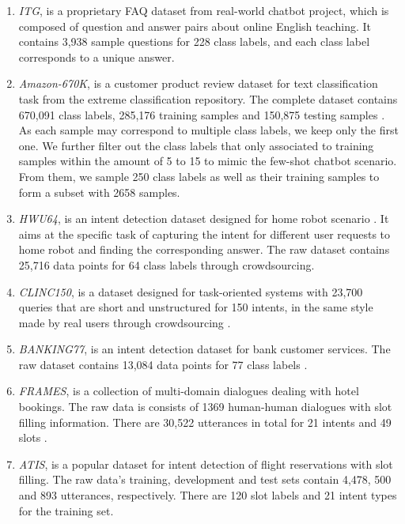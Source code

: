\begin{enumerate}
  \item \emph{ITG},  is  a proprietary FAQ dataset from real-world
  chatbot  project,  which is composed of question and answer pairs about online
  English teaching. It contains 3,938 sample questions for 228 class labels, and
  each class label corresponds to a unique answer.

  \item \emph{Amazon-670K}, is a customer product review dataset for
  text  classification  task  from  the  extreme  classification repository. The
  complete  dataset  contains 670,091 class labels, 285,176 training samples and
  150,875   testing   samples   \cite{bhatia2016extreme}.  As  each  sample  may
  correspond  to  multiple  class labels, we keep only the first one. We further
  filter  out the class labels that only associated to training samples within the amount of 5 to 15 to  mimic  the  few-shot chatbot scenario. From them, we sample 250 class
  labels as well as their training samples to form a subset with 2658 samples.

  \item \emph{HWU64}, is an intent detection dataset designed for
  home  robot  scenario \cite{liu2019benchmarking}. It aims at the specific task
  of  capturing  the  intent  for  different  user requests to home robot and
  finding  the corresponding answer. The raw dataset contains 25,716 data points
  for 64 class labels through crowdsourcing.

  \item \emph{CLINC150},  is  a dataset designed for task-oriented
  systems  with  23,700 queries that are short and unstructured for 150 intents,
  in    the    same   style   made   by   real   users   through   crowdsourcing
  \cite{larson2019evaluation}.

  \item \emph{BANKING77}, is an intent detection dataset for bank
  customer  services.  The  raw dataset contains 13,084 data points for 77 class
  labels \cite{casanueva2020efficient}.
  
  \item \emph{FRAMES}, is a collection of multi-domain dialogues dealing with
hotel bookings. The raw data is consists of 1369 human-human
dialogues with slot filling information. There are 30,522 utterances in total for 21 intents and 49 slots \cite{asri2017frames}.

  \item \emph{ATIS}, is a popular dataset for intent detection of flight reservations with slot filling\cite{tur2010left}. The raw data's training, development and test sets contain 4,478, 500 and 893 utterances, respectively. There are 120 slot labels and 21 intent types for the training set.

\end{enumerate}

